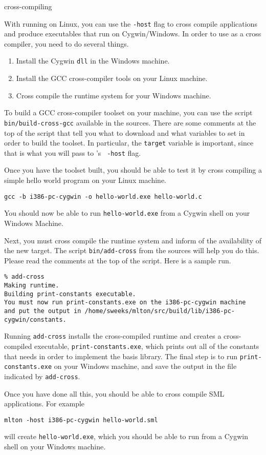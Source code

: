       {cross-compiling}

With {\mlton} running on Linux, you can use the {\tt -host} flag to cross
compile applications and produce executables that run on Cygwin/Windows.
In order to use {\mlton} as a
cross compiler, you need to do several things.

\begin{enumerate}

\item Install the Cygwin {\tt dll} in the Windows machine.

\item Install the GCC cross-compiler tools on your Linux machine.

\item Cross compile the {\mlton} runtime system for your Windows machine.

\end{enumerate}

To build a GCC cross-compiler toolset on your machine, you can use the script
{\tt bin/build-cross-gcc} available in the {\mlton} sources.  There are some
comments at the top of the script that tell you what to download and what
variables to set in order to build the toolset.  In particular, the {\tt target}
variable is important, since that is what you will pass to {\mlton}'s {\tt
-host} flag.

Once you have the toolset built, you should be able to test it by cross
compiling a simple hello world program on your Linux machine.
\begin{verbatim}
gcc -b i386-pc-cygwin -o hello-world.exe hello-world.c
\end{verbatim}
You should now be able to run {\tt hello-world.exe} from a Cygwin shell on your
Windows Machine.

Next, you must cross compile the {\mlton} runtime system and inform {\mlton} of
the availability of the new target.  The script {\tt bin/add-cross} from
the {\mlton} sources will help you do this.  Please read the comments at
the top of the script.  Here is a sample run.
\begin{verbatim}
% add-cross
Making runtime.
Building print-constants executable.
You must now run print-constants.exe on the i386-pc-cygwin machine
and put the output in /home/sweeks/mlton/src/build/lib/i386-pc-cygwin/constants.
\end{verbatim}
Running {\tt add-cross} installs the cross-compiled runtime and creates a
cross-compiled executable, {\tt print-constants.exe}, which prints out all of
the constants that {\mlton} needs in order to implement the basis library.  The
final step is to run {\tt print-constants.exe} on your Windows machine, and save
the output in the file indicated by {\tt add-cross}.

Once you have done all this, you should be able to cross compile SML
applications.  For example
\begin{verbatim}
mlton -host i386-pc-cygwin hello-world.sml
\end{verbatim}
will create {\tt hello-world.exe}, which you should be able to run from a Cygwin
shell on your Windows machine.
